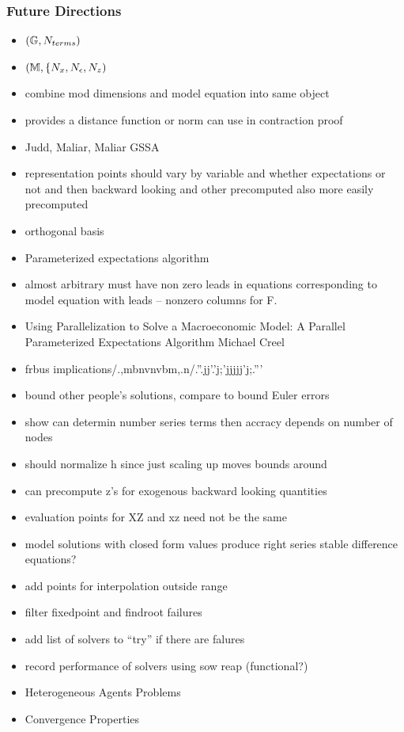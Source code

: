 \documentclass[tikz]{beamer}
\begin{document}
\begin{frame}
  \frametitle{Future Directions}
  \begin{itemize}
  \item $({\mathbb{G}},{N_{terms}})$
  \item $(\mathbb{M},\{{N_x},{N_\epsilon},{N_z})$
  \item combine mod dimensions and model equation into same object
  \item provides a distance function or norm can use in contraction proof
  \item Judd, Maliar, Maliar GSSA
  \item representation points should vary by variable and whether expectations or not and then backward looking and other precomputed also more easily precomputed
  \item orthogonal basis
  \item Parameterized expectations algorithm
  \item almost arbitrary must have non zero leads in equations corresponding to model equation with leads -- nonzero columns for F.
  \item Using Parallelization to Solve a Macroeconomic Model: A Parallel Parameterized Expectations Algorithm
Michael Creel
  \item frbus implications/.,mbnvnvbm,.n/.''.jj'.'j;'jjjjj'j;.'''
  \item bound other people's solutions, compare to bound Euler errors
  \item show can determin number series terms then accracy depends on number of nodes
  \item should normalize h since just scaling up moves bounds around
  \item can precompute z's for exogenous backward looking quantities
  \item evaluation points for XZ and xz need not be the same
  \item model solutions with closed form values produce right series stable difference equations?
  \item add points for interpolation outside range
  \item filter fixedpoint and findroot failures
  \item add list of solvers to ``try'' if there are falures
  \item record performance of solvers using sow reap (functional?)
  \item Heterogeneous Agents Problems
  \item Convergence Properties

\end{itemize}
\end{frame}
\end{document}
